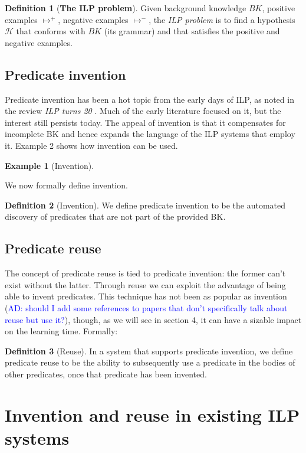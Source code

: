 \documentclass{article}
\newcommand{\ad}[1]{\textcolor{blue}{AD: #1}}
\newtheorem{example}{Example}
\theoremstyle{definition}
\newtheorem{defn}{Definition}[section]
\begin{document}
\begin{defn}[\textbf{The ILP problem}]
Given background knowledge $BK$, positive examples $\mapsto^+$, negative examples $\mapsto^-$, the \emph{ILP problem} is to find a hypothesis $\mathcal{H}$ that conforms with $BK$ (its grammar) and that satisfies the positive and negative examples.  
\end{defn}

\subsection{Predicate invention}
Predicate invention has been a hot topic from the early days of ILP, as noted in the review \textit{ILP turns 20} \cite{ilpturns20}. Much of the early literature focused on it, but the interest still persists today. The appeal of invention is that it compensates for incomplete BK and hence expands the language of the ILP systems that employ it. Example 2 shows how invention can be used.

\begin{example}[Invention]
\end{example}

We now formally define invention.
\begin{defn}[Invention]
We define predicate invention to be the automated discovery of predicates that are not part of the provided BK.
\end{defn}
 
\subsection{Predicate reuse}
The concept of predicate reuse is tied to predicate invention: the former can't exist without the latter. Through reuse we can exploit the advantage of being able to invent predicates. This technique has not been as popular as invention (\ad{should I add some references to papers that don't specifically talk about reuse but use it?}), though, as we will see in section 4, it can have a sizable impact on the learning time. Formally:

\begin{defn}[Reuse]
In a system that supports predicate invention, we define predicate reuse to be the ability to subsequently use a predicate in the bodies of other predicates, once that predicate has been invented.
\end{defn}



\section{Invention and reuse in existing ILP systems}
\end{document}
